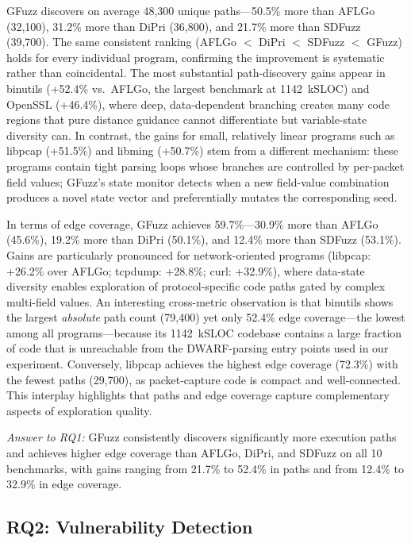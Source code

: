 \documentclass[preprint,12pt,3p]{elsarticle}
\begin{document}
GFuzz discovers on average 48,300 unique paths---50.5\% more than AFLGo
(32,100), 31.2\% more than DiPri (36,800), and 21.7\% more than SDFuzz
(39,700).  The same consistent ranking (AFLGo $<$ DiPri $<$ SDFuzz $<$
GFuzz) holds for every individual program, confirming the improvement is
systematic rather than coincidental.  The most substantial path-discovery
gains appear in binutils (+52.4\% vs.\ AFLGo, the largest benchmark at
1142~kSLOC) and OpenSSL (+46.4\%), where deep, data-dependent branching
creates many code regions that pure distance guidance cannot differentiate
but variable-state diversity can.  In contrast, the gains for small,
relatively linear programs such as libpcap (+51.5\%) and libming (+50.7\%)
stem from a different mechanism: these programs contain tight parsing loops
whose branches are controlled by per-packet field values; GFuzz's state
monitor detects when a new field-value combination produces a novel
state vector and preferentially mutates the corresponding seed.

In terms of edge coverage, GFuzz achieves 59.7\%---30.9\% more than AFLGo
(45.6\%), 19.2\% more than DiPri (50.1\%), and 12.4\% more than SDFuzz
(53.1\%).  Gains are particularly pronounced for network-oriented programs
(libpcap: +26.2\% over AFLGo; tcpdump: +28.8\%; curl: +32.9\%), where
data-state diversity enables exploration of protocol-specific code paths
gated by complex multi-field values.  An interesting cross-metric observation
is that binutils shows the largest \emph{absolute} path count (79,400) yet
only 52.4\% edge coverage---the lowest among all programs---because its
1142~kSLOC codebase contains a large fraction of code that is unreachable
from the DWARF-parsing entry points used in our experiment.  Conversely,
libpcap achieves the highest edge coverage (72.3\%) with the fewest paths
(29,700), as packet-capture code is compact and well-connected.  This
interplay highlights that paths and edge coverage capture complementary
aspects of exploration quality.

\textit{Answer to RQ1:} GFuzz consistently discovers significantly more
execution paths and achieves higher edge coverage than AFLGo, DiPri, and
SDFuzz on all 10 benchmarks, with gains ranging from 21.7\% to 52.4\% in
paths and from 12.4\% to 32.9\% in edge coverage.

\subsection{RQ2: Vulnerability Detection}
\end{document}
